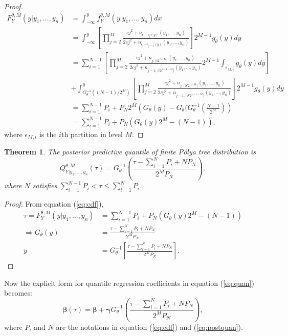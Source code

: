 \documentclass[12pt]{article}
\newtheorem{thm}{Theorem}[section]
\newcommand{\polya}{P\'{o}lya}
\begin{document}
\begin{proof}
  \begin{align*}
    F^{\theta,M}_Y(y| y_1, \ldots, y_n) & = \int_{-\infty}^y
    f_Y^{\theta,M} (y|y_1, \ldots, y_n) dx \\
    & = \int_{-\infty}^y \left[ \prod_{j=2}^M \frac{cj^2 +
        n_{\epsilon_1 \cdots \epsilon_j(y) }(y_1 , \ldots, y_n)}{2cj^2
        + n_{\epsilon_1 \cdots \epsilon_{j-1}(y)}(y_1, \ldots, y_n)}
    \right]2^{M-1} g_\theta(y) dy \\
    & = \sum_{i=1}^{N-1} \left[ \prod_{j=2}^M \frac{cj^2 + n_{j,
          \lceil i2^{j-M} \rceil}(y_1, \ldots, y_n)}{2cj^2 + n_{j-1,
          \lceil i2^{j-1-M} \rceil}(y_1, \ldots, y_n)} 2^{M-1}
      \int_{\epsilon_{M,i}} g_{\theta}(y) dy \right] \\
    &+ \int_{G^{-1}_{\theta}((N-1)/2^M)}^y \left[ \prod_{j=2}^M
      \frac{cj^2 + n_{j, \lceil N2^{j-M} \rceil}(y_1, \ldots,
        y_n)}{2cj^2 + n_{j-1, \lceil N2^{j-1-M} \rceil}(y_1, \ldots,
        y_n)}\right] 2^{M-1}
    g_{\theta}(y) dy \\
    & = \sum_{i=1}^{N-1} P_i + P_N 2^M \left( G_{\theta}(y) -
      G_{\theta}(G_{\theta}^{-1}\left( \frac{N-1}{2^M} \right)\right)\\
    & = \sum_{i=1}^{N-1}P_i + P_N \left( G_{\theta}(y) 2^M - (N-1)
    \right),
  \end{align*}
  where $\epsilon_{M,i}$ is the $i$th partition in level $M$.
\end{proof}

\begin{thm}
  The posterior predictive quantile of finite \polya{} tree
  distribution is
  \begin{equation}
    \label{eq:postquan}
    Q^{\theta, M}_{Y|y_1, \ldots, y_n}(\tau) = G^{-1}_{\theta} \left(
      \frac{\tau- \sum_{i=1}^N P_i + N P_N}{2^M P_N} \right),
  \end{equation}
  where $N$ satisfies $ \sum_{i=1}^{N-1} P_i < \tau \le \sum_{i=1}^N
  P_i$.
\end{thm}

\begin{proof}
  From equation (\ref{eq:cdf}),
  \begin{align*}
    \tau = F^{\theta,M}_Y(y|y_1, \ldots, y_n) &= \sum_{i=1}^{N-1}
    P_{i} + P_N
    \left( G_{\theta}(y)2^M -(N-1) \right) \\
    \Rightarrow G_{\theta}(y) &= \frac{\tau - \sum_{i=1}^NP_i +
      NP_N}{2^MP_N} \\
    y & = G_{\theta}^{-1} \left[\frac{\tau - \sum_{i=1}^NP_i +
        NP_N}{2^MP_N} \right].
  \end{align*}
\end{proof}
Now the explicit form for quantile regression coefficients in equation
(\ref{eq:quan}) becomes:
\begin{equation}
  \label{eq:newquan}
  \bm{\beta}(\tau) = \bm{\beta} + \bm{\gamma}G_{\theta}^{-1}
  \left(\frac{\tau - \sum_{i=1}^NP_i +
      NP_N}{2^MP_N}  \right) ,
\end{equation}
where $P_i$ and $N$ are the notations in equation (\ref{eq:cdf}) and
(\ref{eq:postquan}).
\end{document}
